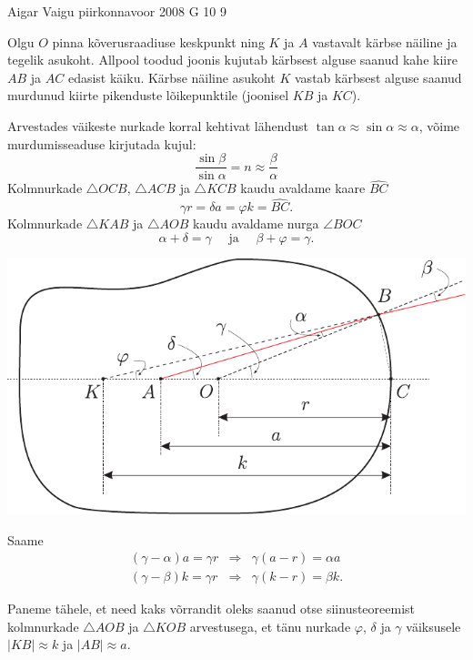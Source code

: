 \documentclass[11pt, twoside]{article}
\begin{document}
{%
{Aigar Vaigu} %
{piirkonnavoor} %
{2008} %
{G 10} %
{9} %
{

\ifSolution
Olgu $O$ pinna kõverusraadiuse keskpunkt ning $K$ ja $A$ vastavalt kärbse näiline ja tegelik asukoht. Allpool toodud joonis kujutab kärbsest alguse saanud kahe kiire $AB$ ja $AC$ edasist käiku. Kärbse näiline asukoht $K$ vastab kärbsest alguse saanud murdunud kiirte pikenduste lõikepunktile (joonisel $KB$ ja $KC$).

Arvestades väikeste nurkade korral kehtivat lähendust $\tan \alpha \approx \sin \alpha \approx \alpha$, võime murdumisseaduse kirjutada kujul:
\[
\frac{\sin \beta}{\sin \alpha}=n \approx \frac{\beta}{\alpha}
\]
Kolmnurkade $\triangle OCB$, $\triangle ACB$ ja $\triangle KCB$ kaudu avaldame kaare $\widehat{BC}$
\[
\gamma r=\delta a=\varphi k=\widehat{BC}.
\]
Kolmnurkade $\triangle KAB$ ja $\triangle AOB$ kaudu avaldame nurga $\angle BOC$
\[
\alpha+\delta=\gamma \quad \text { ja } \quad \beta+\varphi=\gamma.
\]

\begin{center}
	\includegraphics[width=\linewidth]{2008-v2g-10-lah}
\end{center}

Saame
\[
\begin{array}{lll}{(\gamma-\alpha) a=\gamma r} & {\Rightarrow} & {\gamma(a-r)=\alpha a} \\ {(\gamma-\beta) k=\gamma r} & {\Rightarrow} & {\gamma(k-r)=\beta k.}\end{array}
\]

Paneme tähele, et need kaks võrrandit oleks saanud otse siinusteoreemist kolmnurkade $\triangle AOB$ ja $\triangle KOB$ arvestusega, et tänu nurkade $\varphi$, $\delta$ ja $\gamma$ väiksusele $|KB| \approx k$ ja $|AB| \approx a$.

}}
\end{document}
